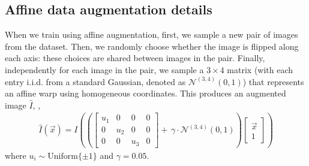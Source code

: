 
\subsection{Affine data augmentation details}
\label{sec:affine_augmentation}
When we train using affine augmentation, first, we sample a new pair of images from the dataset. Then, we randomly choose whether the image is flipped along each axis: these choices are shared between images in the pair. Finally, independently for each image in the pair, we sample a $3 \times 4$ matrix (with each entry i.i.d. from a standard Gaussian, denoted as $\mathcal{N}^{(3, 4)}(0, 1)$) that represents an affine warp using homogeneous coordinates. This produces an augmented image $\hat{I}$, \ie,
\begin{align*}\hat{I}(\Vec{x}) = I\left(\left(
		\begin{bmatrix}
			u_1 & 0   & 0   & 0 \\
			0   & u_2 & 0   & 0 \\
			0   & 0   & u_3 & 0
		\end{bmatrix}
		{+}\, \gamma \cdot \mathcal{N}^{(3, 4)}(0, 1) \right)
	\begin{bmatrix}
			\Vec{x} \\
			1
		\end{bmatrix}\right)
\end{align*}
where $u_i \sim \text{Uniform}\{\pm 1\}$ and $\gamma=0.05$.
